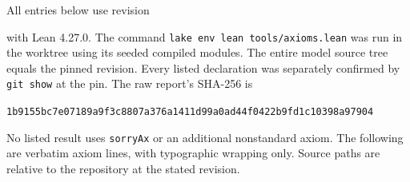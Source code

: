 All entries below use revision
\begin{center}\small\texttt{\modelpin}\end{center}
with Lean 4.27.0. The command \texttt{lake env lean tools/axioms.lean}
was run in the worktree using its seeded compiled modules. The entire model
source tree equals the pinned revision. Every listed declaration was separately
confirmed by \texttt{git show} at the pin. The raw report's SHA-256 is
\begin{center}\scriptsize\nolinkurl{1b9155bc7e07189a9f3c8807a376a1411d99a0ad44f0422b9fd1c10398a97904}\end{center}
No listed result uses \texttt{sorryAx} or an additional nonstandard axiom.
The following are verbatim axiom lines, with typographic wrapping only.
Source paths are relative to the repository at the stated revision.
\begingroup\footnotesize
